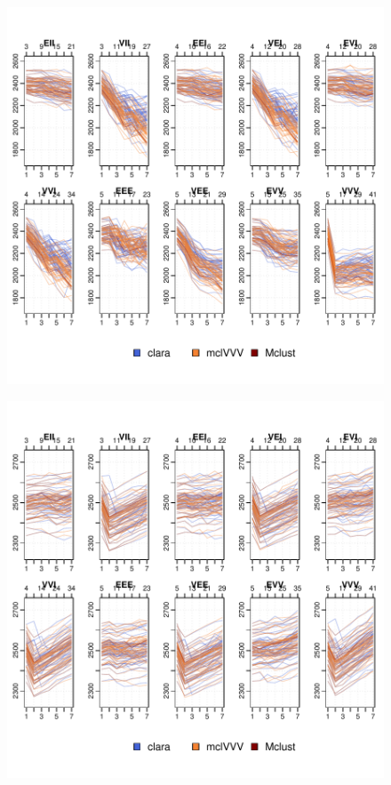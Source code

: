 \begin{figure}
    \centering
\includegraphics{App_plots-011}
\end{figure}

\begin{figure}
    \centering
\includegraphics{App_plots-012}
\end{figure}

